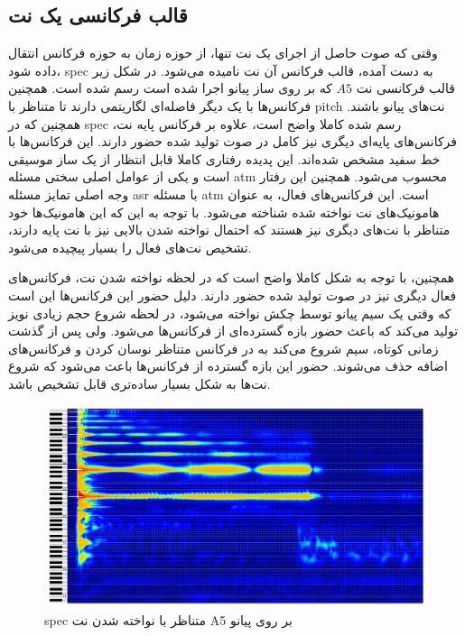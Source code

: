 \subsection{قالب فرکانسی یک نت}
وقتی که صوت حاصل از اجرای یک نت تنها، از حوزه زمان به حوزه فرکانس انتقال داده
شود، \gls{spec} به دست آمده، قالب فرکانس آن نت نامیده می‌شود. در شکل زیر قالب
فرکانسی نت $A5$ که بر روی ساز پیانو اجرا شده است رسم شده است. همچنین فرکانس‌ها
با یک دیگر فاصله‌ای لگاریتمی دارند تا متناظر با \gls{pitch} نت‌های پیانو باشند.
همچنین که در \gls{spec} رسم شده کاملا واضح است، علاوه بر فرکانس پایه نت،
فرکانس‌های پایه‌ای دیگری نیز کامل در صوت تولید شده حضور دارند. این فرکانس‌ها با
خط سفید مشخص شده‌اند. این پدیده رفتاری کاملا قابل انتظار از یک ساز موسیقی است و
یکی از عوامل اصلی سختی مسئله \gls{atm} محسوب می‌شود. همچنین این رفتار وجه اصلی
تمایز مسئله \gls{asr} با مسئله \gls{atm} است. این فرکانس‌‌های فعال، به عنوان
هامونیک‌های نت نواخته شده شناخته می‌شود. با توجه به این که این هامونیک‌ها خود
متناظر با نت‌های دیگری نیز هستند که احتمال نواخته شدن بالایی نیز با نت پایه
دارند، تشخیص نت‌های فعال را بسیار پیچیده می‌شود.

همچنین، با توجه به شکل کاملا واضح است که در لحظه نواخته شدن نت، فرکانس‌های فعال
دیگری نیز در صوت تولید شده حضور دارند. دلیل حضور این فرکانس‌ها این است که وقتی
یک سیم پیانو توسط چکش نواخته می‌شود، در لحظه شروع حجم زیادی نویز تولید می‌کند که
باعث حضور بازه گسترده‌ای از فرکانس‌ها می‌شود. ولی پس از گذشت زمانی کوتاه، سیم
شروع می‌کند به در فرکانس متناظر نوسان کردن و فرکانس‌های اضافه حذف می‌شوند. حضور
این بازه گسترده از فرکانس‌ها باعث می‌شود که شروع نت‌ها به شکل بسیار ساده‌تری
قابل تشخیص باشد.
\begin{figure}[ht]
    \centering
    \includegraphics[width=15cm]{./statics/a5_spec.png}
    \caption{\gls{spec} متناظر با نواخته شدن نت A5 بر روی پیانو}
\end{figure}

